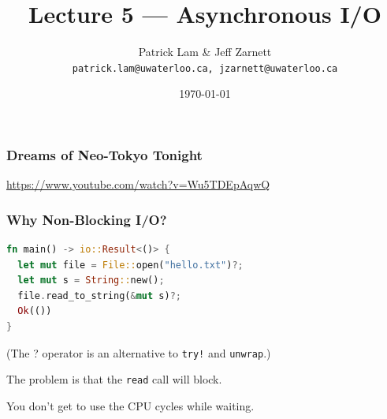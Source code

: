 

\title{Lecture 5 --- Asynchronous I/O}

\author{Patrick Lam \& Jeff Zarnett \\ \small \texttt{patrick.lam@uwaterloo.ca, jzarnett@uwaterloo.ca}}
\date{\today}




\begin{frame}
  \titlepage

 \end{frame}


\begin{frame}
\frametitle{Dreams of Neo-Tokyo Tonight}

\begin{center}
\end{center}

\url{https://www.youtube.com/watch?v=Wu5TDEpAqwQ}

\end{frame}


\begin{frame}[fragile]
\frametitle{Why Non-Blocking I/O?}

\begin{lstlisting}[language=Rust]
fn main() -> io::Result<()> {
  let mut file = File::open("hello.txt")?;
  let mut s = String::new();
  file.read_to_string(&mut s)?;
  Ok(()) 
}
\end{lstlisting}


(The ? operator is an alternative to
\texttt{try!} and \texttt{unwrap}.)


The problem is that the {\tt read} call will \alert{block}.

You don't get to use the CPU cycles while waiting.
\end{frame}


